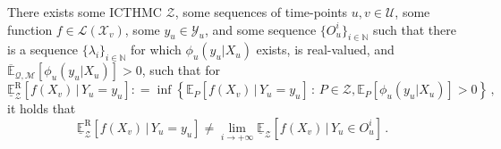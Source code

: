 \documentclass[twoside,11pt]{article}
\newcommand{\nats}{\mathbb{N}}
\newcommand{\states}{\mathcal{X}}
\newcommand{\observs}{\mathcal{Y}}
\newcommand{\uexp}{\overline{\mathbb{E}}_{\rateset,\mathcal{M}}}
\newcommand{\gambles}{\mathcal{L}}
\newcommand{\rateset}{\mathcal{Q}}
\newcommand{\coloneqq}{:\!=}
\begin{document}
\begin{proposition}\label{prop:counter_example_regular}
There exists some ICTHMC $\mathcal{Z}$, some sequences of time-points $u,v\in\mathcal{U}$, some function $f\in\gambles(\states_v)$, some $y_u\in\observs_u$, and some sequence $\{O_u^i\}_{i\in\nats}$ such that there is a sequence $\{\lambda_i\}_{i\in\nats}$ for which $\phi_u(y_u\vert X_u)$ exists, is real-valued, and $\uexp[\phi_u(y_u\vert X_u)]>0$, such that for
\begin{equation*}
\underline{\mathbb{E}}_\mathcal{Z}^\mathrm{R}[f(X_v)\,\vert\, Y_u=y_u] \coloneqq \inf\left\{ \mathbb{E}_P[f(X_v)\,\vert\,Y_u=y_u]\,:\,P\in\mathcal{Z}, \mathbb{E}_P[\phi_u(y_u\vert X_u)]>0  \right\}\,,
\end{equation*}
it holds that
\begin{equation*}
\underline{\mathbb{E}}_\mathcal{Z}^\mathrm{R}[f(X_v)\,\vert\, Y_u=y_u] \neq \lim_{i\to+\infty} \underline{\mathbb{E}}_\mathcal{Z}[f(X_v)\,\vert\, Y_u\in O_u^i]\,.
\end{equation*}
\end{proposition}
\end{document}
